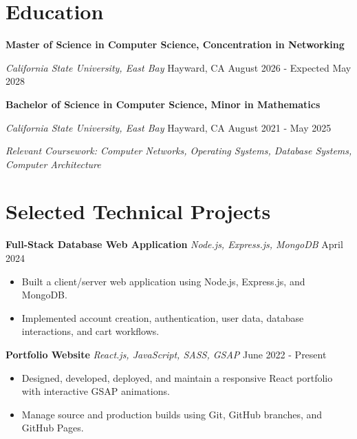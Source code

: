 \documentclass[letterpaper,10pt]{article}
\newcommand{\resumeEntry}[4]{%
  \textbf{#1}\par
  {\small\textit{#3} \textbar{} #4 \textbar{} #2}\par\vspace{-1pt}%
}
\newcommand{\projectEntry}[3]{%
  \textbf{#1} \textbar{} \textit{#2} \textbar{} #3\par\vspace{-1pt}%
}
\begin{document}
\section{Education}

\resumeEntry
  {Master of Science in Computer Science, Concentration in Networking}
  {August 2026 - Expected May 2028}
  {California State University, East Bay}
  {Hayward, CA}

\resumeEntry
  {Bachelor of Science in Computer Science, Minor in Mathematics}
  {August 2021 - May 2025}
  {California State University, East Bay}
  {Hayward, CA}
\textit{Relevant Coursework: Computer Networks, Operating Systems, Database Systems, Computer Architecture}

\section{Selected Technical Projects}

\projectEntry
  {Full-Stack Database Web Application}
  {Node.js, Express.js, MongoDB}
  {April 2024}
\begin{itemize}
  \item Built a client/server web application using Node.js, Express.js, and MongoDB.
  \item Implemented account creation, authentication, user data, database interactions, and cart workflows.
\end{itemize}

\projectEntry
  {Portfolio Website}
  {React.js, JavaScript, SASS, GSAP}
  {June 2022 - Present}
\begin{itemize}
  \item Designed, developed, deployed, and maintain a responsive React portfolio with interactive GSAP animations.
  \item Manage source and production builds using Git, GitHub branches, and GitHub Pages.
\end{itemize}
\end{document}
